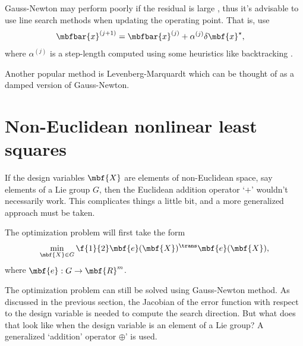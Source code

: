 \documentclass[ nobib, nofonts, notoc]{tufte-handout}
\begin{document}
    Gauss-Newton may perform poorly if the residual is large \cite{Nocedal_Numerical_2006,Fletcher_Practical_1987}, thus it's advisable to use line search methods when updating the operating point. That is, use
    \begin{align}
        \mbfbar{x}^{(j+1)} &= \mbfbar{x}^{(j)} + \alpha^{(j)}\delta\mbf{x}^{\star},
    \end{align}
    where $\alpha^{(j)}$ is a step-length computed using some heuristics like backtracking \cite{Nocedal_Numerical_2006}.

    Another popular method is Levenberg-Marquardt \cite{Dellaert_Factor_2017,Nocedal_Numerical_2006} which can be thought of as a damped version of Gauss-Newton.

    \section{Non-Euclidean nonlinear least squares}
    If the design variables $\mbf{X}$ are elements of non-Euclidean space, say elements of a Lie group $G$, then the Euclidean addition operator `$+$' wouldn't necessarily work.
    This complicates things a little bit, and a more generalized approach must be taken.
    
    The optimization problem will first take the form
    \begin{align}
        \min_{\mbf{X}\in G} \f{1}{2}\mbf{e}(\mbf{X})^{\trans}\mbf{e}(\mbf{X}),
    \end{align}
    where $\mbf{e} : G \to \mbf{R}^{m}$. 

    The optimization problem can still be solved using Gauss-Newton method. 
    As discussed in the previous section, the Jacobian of the error function with respect to the design variable is needed to compute the search direction. 
    But what does that look like when the design variable is an element of a Lie group?
    A generalized `addition' operator $\oplus$' is used. 
    
\end{document}
